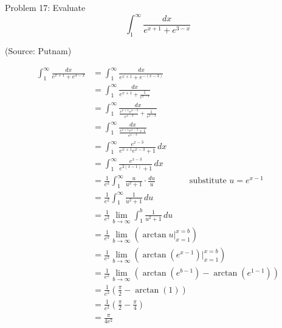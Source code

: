 Problem 17: Evaluate $$ \int_1^\infty \frac{dx}{e^{x+1} + e^{3-x}} $$

(Source: Putnam)

\begin{align*}
\int_1^\infty \frac{dx}{e^{x+1} + e^{3-x}} &= \int_1^\infty \frac{dx}{e^{x+1} + e^{-(x-3)}} \\
&= \int_1^\infty \frac{dx}{e^{x+1} + \frac{1}{e^{x-3}}} \\ 
&= \int_1^\infty \frac{dx}{\frac{e^{x+1}e^{x-3}}{e^{x-3}} + \frac{1}{e^{x-3}}} \\ 
&= \int_1^\infty \frac{dx}{\frac{e^{x+1}e^{x-3} + 1}{e^{x-3}}} \\ 
&= \int_1^\infty \frac{e^{x-3}}{e^{x+1}e^{x-3} + 1} \, dx \\
&= \int_1^\infty \frac{e^{x-3}}{e^{2(x-1)} + 1} \, dx \\
&= \frac{1}{e^2} \int_1^\infty \frac{u}{u^2 + 1} \cdot \frac{du}{u} \qquad \qquad \text{substitute } u = e^{x-1} \\
&= \frac{1}{e^2} \int_1^\infty \frac{1}{u^2 + 1} \, du \\
&= \frac{1}{e^2} \lim_{b \rightarrow \infty} \int_1^b \frac{1}{u^2 + 1} \, du \\
&= \frac{1}{e^2} \lim_{b \rightarrow \infty} \left( \arctan u \Bigg|_{x=1}^{x=b} \right) \\
&= \frac{1}{e^2} \lim_{b \rightarrow \infty} \left( \arctan(e^{x-1}) \Bigg|_{x=1}^{x=b} \right) \\
&= \frac{1}{e^2} \lim_{b \rightarrow \infty} \left( \arctan(e^{b-1}) - \arctan(e^{1-1}) \right) \\
&= \frac{1}{e^2} \left( \frac{\pi}{2} - \arctan(1) \right) \\
&= \frac{1}{e^2} \left( \frac{\pi}{2} - \frac{\pi}{4} \right) \\
&= \boxed{\frac{\pi}{4e^2}} \\
\end{align*}
